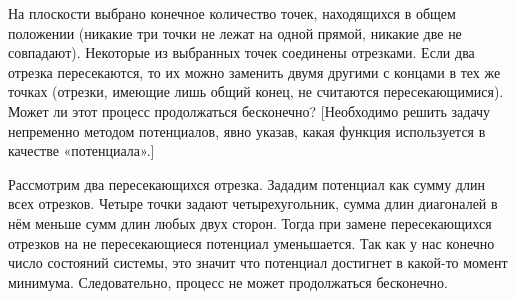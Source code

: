 \begin{task}{11}
	На плоскости выбрано конечное количество точек, находящихся в общем положении (никакие три точки не лежат на одной прямой, никакие две не совпадают). Некоторые из выбранных точек соединены отрезками. Если два отрезка пересекаются, то их можно заменить двумя другими с концами в тех же точках (отрезки, имеющие лишь общий конец, не считаются пересекающимися). Может ли этот процесс продолжаться бесконечно? [Необходимо решить задачу непременно методом потенциалов, явно указав, какая функция используется в качестве «потенциала».]
\end{task}

\begin{solution} 
	Рассмотрим два пересекающихся отрезка. Зададим потенциал как сумму длин всех отрезков.  Четыре точки задают четырехугольник, сумма длин диагоналей в нём меньше сумм длин любых двух сторон. Тогда при замене пересекающихся отрезков на не пересекающиеся потенциал уменьшается. Так как у нас конечно число состояний системы, это значит что потенциал достигнет в какой-то момент минимума. Следовательно, процесс не может продолжаться бесконечно.
\end{solution}